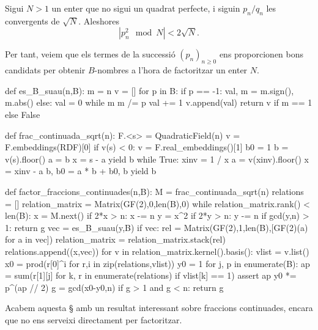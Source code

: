 \begin{corollary}
 Sigui $N>1$ un enter que no sigui un quadrat perfecte, i siguin $p_n/q_n$ les convergents de $\sqrt{N}$.  Aleshores
 \[
 |p_n^2 \mod N| < 2\sqrt{N}.
 \]
 \end{corollary}

Per tant, veiem que els termes de la successió $(p_n)_{n\geq 0}$ ens proporcionen bons candidats per obtenir $B$-nombres a l'hora de factoritzar un enter $N$.

\begin{python}
def es_B_suau(n,B):
    m = n
    v = []
    for p in B:
        if p == -1:
            val, m = m.sign(), m.abs()
        else:
            val = 0
            while m %
                m /= p
                val += 1
        v.append(val)
    return v if  m == 1 else False
    
def frac_continuada_sqrt(n):
    F.<s> = QuadraticField(n)
    v = F.embeddings(RDF)[0]
    if v(s) < 0:
        v = F.real_embeddings()[1]
    b0 = 1
    b = v(s).floor()
    a = b
    x = s - a
    yield b
    while True:
        xinv = 1 / x
        a =  v(xinv).floor()
        x = xinv - a
        b, b0 = a * b + b0, b
        yield b
        
def factor_fraccions_continuades(n,B):
    M = frac_continuada_sqrt(n)
    relations = []
    relation_matrix = Matrix(GF(2),0,len(B),0)
    while relation_matrix.rank() < len(B):
        x = M.next()
        if 2*x > n:
            x -= n
        y = x^2 %
        if 2*y > n:
            y -= n
        if gcd(y,n) > 1:
            return g
        vec = es_B_suau(y,B)
        if vec:
            rel = Matrix(GF(2),1,len(B),[GF(2)(a) for a in vec])
            relation_matrix = relation_matrix.stack(rel)
            relations.append((x,vec))
            for v in relation_matrix.kernel().basis():
                vlist = v.list()
                x0 = prod(r[0]^i for r,i in zip(relations,vlist))
                y0 = 1
                for j, p in enumerate(B):
                    ap = sum(r[1][j] for k, r in enumerate(relations) if vlist[k] == 1)
                    assert ap %
                    y0 *= p^(ap // 2)
                g = gcd(x0-y0,n)
                if g > 1 and g < n:
                    return g
\end{python}

Acabem aquesta \S{} amb un resultat interessant sobre fraccions continuades, encara que no ens serveixi directament per factoritzar.

